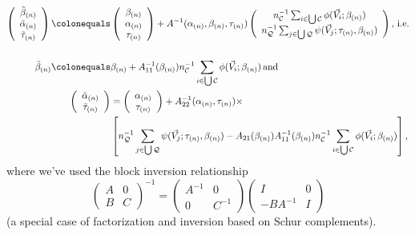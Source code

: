 \documentclass{article}
\newcommand{\defeq}{\ensuremath{\colonequals}}
\begin{document}
  \begin{align}
    \left(\begin{array}{c}\tilde{\beta}_{(n)}\\\tilde{\alpha}_{(n)}\\ \tilde{\tau}_{(n)} \end{array}\right)
    \defeq& \left(\begin{array}{c}\beta_{(n)} \\\alpha_{(n)}\\
                    \tau_{(n)} \end{array}\right)
    + A^{-1}(\alpha_{(n)}, \beta_{(n)}, \tau_{(n)})\left(
    \begin{array}{c}
      n_{\mathcal{C}}^{-1}\sum_{i\in \bigcup
      \mathcal{C}}\phi(\vec{V}_{i}; \beta_{(n)})\\
      n_{\mathcal{Q}}^{-1}\sum_{j\in \bigcup
                 \mathcal{Q}}\psi(\vec{V}_{j};
                 \tau_{(n)},\beta_{(n)} )
    \end{array}
    \right),\, \text{i.e.} \nonumber \\
   \nonumber \\
       \tilde{\beta}_{(n)}
    \defeq& \beta_{(n)} + A_{11}^{-1}(\beta_{(n)})n_{\mathcal{C}}^{-1}\sum_{i\in \bigcup \mathcal{C}}\phi(\vec{V}_{i}; \beta_{(n)})
  \, \text{and} \nonumber\\
\left(\begin{array}{c}\tilde{\alpha}_{(n)}\\ \tilde{\tau}_{(n)} \end{array}\right)               &=\left(\begin{array}{c}\alpha_{(n)}\\
                         \tau_{(n)} \end{array}\right) +
    A_{22}^{-1}(\alpha_{(n)}, \tau_{(n)})\times \label{eq:20}\\
    & \left[
                 n_{\mathcal{Q}}^{-1}\sum_{j\in \bigcup
                 \mathcal{Q}}\psi(\vec{V}_{j};
                 \tau_{(n)},\beta_{(n)} ) - A_{21}(\beta_{(n)}) A_{11}^{-1}(\beta_{(n)})n_{\mathcal{C}}^{-1}\sum_{i\in \bigcup \mathcal{C}}\phi(\vec{V}_{i}; \beta_{(n)})\right],\nonumber
\end{align}
where we've used the block inversion relationship
\begin{equation*}
  \label{eq:23}
  \left(\begin{array}{cc}A & 0 \\ B & C \end{array} \right)^{-1} =
  \left(\begin{array}{cc}A^{-1} & 0 \\ 0 & C^{-1} \end{array} \right)
  \left(\begin{array}{cc} I & 0 \\ -BA^{-1} & I \end{array} \right)
\end{equation*}
(a special case of factorization and inversion based on Schur complements).
\end{document}
